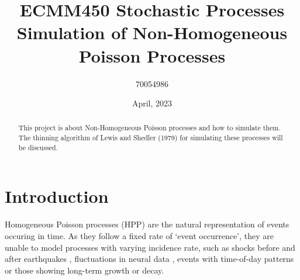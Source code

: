 \documentclass[%
 reprint,
 amsmath,amssymb,
 aps,
]{revtex4-2}
\theoremstyle{definition}
\begin{document}

\title{ECMM450 Stochastic Processes\\Simulation of Non-Homogeneous Poisson Processes}%

\author{70054986}


\date{April, 2023}%

\begin{abstract}
This project is about Non-Homogeneous Poisson processes and how to simulate them. The thinning algorithm of Lewis and Shedler (1979) for simulating these processes will be discussed.

\end{abstract}

\maketitle

\section{\label{sec:level1}Introduction}

Homogeneous Poisson processes (HPP) are the natural representation of events occuring in time. As they follow a fixed rate of `event occurrence', they are unable to model processes with varying incidence rate, such as shocks before and after earthquakes \cite{vere-jones_1970}, fluctuations in neural data \cite{gabbiani_cox_2010}, events with time-of-day patterns or those showing long-term growth or decay.\\
\end{document}
